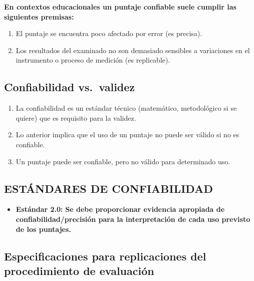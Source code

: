 \documentclass[
  letterpaper,
  DIV=11,
  numbers=noendperiod]{scrreprt}
\providecommand{\tightlist}{%
  \setlength{\itemsep}{0pt}\setlength{\parskip}{0pt}}
\begin{document}
\textbf{En contextos educacionales un puntaje confiable suele cumplir
las siguientes premisas:}

\begin{enumerate}
\def\labelenumi{\arabic{enumi}.}
\tightlist
\item
  El puntaje se encuentra poco afectado por error (es precisa).
\item
  Los resultados del examinado no son demasiado sensibles a variaciones
  en el instrumento o proceso de medición (es replicable).
\end{enumerate}

\subsection{Confiabilidad vs.~validez}\label{confiabilidad-vs.-validez}

\begin{enumerate}
\def\labelenumi{\arabic{enumi}.}
\tightlist
\item
  La confiabilidad es un estándar técnico (matemático, metodológico si
  se quiere) que es requisito para la validez.
\item
  Lo anterior implica que el uso de un puntaje no puede ser válido si no
  es confiable.
\item
  Un puntaje puede ser confiable, pero no válido para determinado uso.
\end{enumerate}

\subsection{ESTÁNDARES DE
CONFIABILIDAD}\label{estuxe1ndares-de-confiabilidad}

\begin{itemize}
\tightlist
\item
  \textbf{Estándar 2.0:} \textbf{Se debe proporcionar evidencia
  apropiada de confiabilidad/precisión para la interpretación de cada
  uso previsto de los puntajes.}
\end{itemize}

\subsection{Especificaciones para replicaciones del procedimiento de
evaluación}\label{especificaciones-para-replicaciones-del-procedimiento-de-evaluaciuxf3n}
\end{document}
